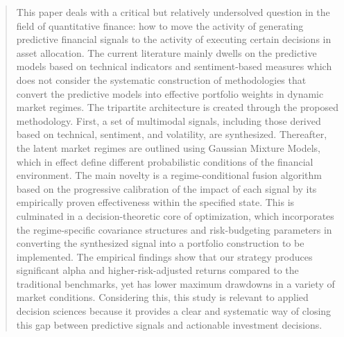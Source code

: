\documentclass{singlecol-new}
\theoremstyle{TH}{
\newtheorem{lemma}{Lemma}
\newtheorem{theorem}[lemma]{Theorem}
\newtheorem{corrolary}[lemma]{Corrolary}
\newtheorem{conjecture}[lemma]{Conjecture}
\newtheorem{proposition}[lemma]{Proposition}
\newtheorem{claim}[lemma]{Claim}
\newtheorem{stheorem}[lemma]{Wrong Theorem}
\newtheorem{algorithm}{Algorithm}
}
\theoremstyle{THrm}{
\newtheorem{definition}{Definition}[section]
\newtheorem{question}{Question}[section]
\newtheorem{remark}{Remark}
\newtheorem{scheme}{Scheme}
}
\theoremstyle{THhit}{
\newtheorem{case}{Case}[section]
}
\begin{document}
\begin{abstract}
This paper deals with a critical but relatively undersolved question in the field of quantitative finance: how to move the activity of generating predictive financial signals to the activity of executing certain decisions in asset allocation. The current literature mainly dwells on the predictive models based on technical indicators and sentiment-based measures which does not consider the systematic construction of methodologies that convert the predictive models into effective portfolio weights in dynamic market regimes. The tripartite architecture is created through the proposed methodology. First, a set of multimodal signals, including those derived based on technical, sentiment, and volatility, are synthesized. Thereafter, the latent market regimes are outlined using Gaussian Mixture Models, which in effect define different probabilistic conditions of the financial environment. The main novelty is a regime-conditional fusion algorithm based on the progressive calibration of the impact of each signal by its empirically proven effectiveness within the specified state. This is culminated in a decision-theoretic core of optimization, which incorporates the regime-specific covariance structures and risk-budgeting parameters in converting the synthesized signal into a portfolio construction to be implemented. The empirical findings show that our strategy produces significant alpha and higher-risk-adjusted returns compared to the traditional benchmarks, yet has lower maximum drawdowns in a variety of market conditions. Considering this, this study is relevant to applied decision sciences because it provides a clear and systematic way of closing this gap between predictive signals and actionable investment decisions.
\end{abstract}


\end{document}
